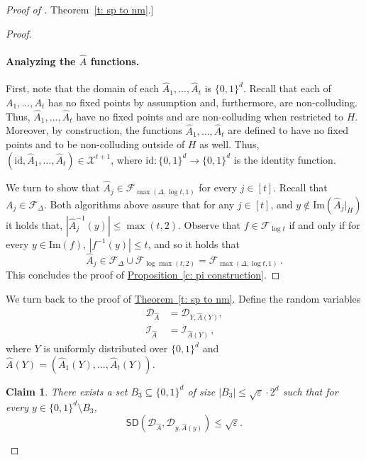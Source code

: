 \documentclass[11pt]{article}
\numberwithin{equation}{section}
\newtheorem{claim}[theorem]{Claim}
\theoremstyle{definition}
\theoremstyle{plain}
\newcommand{\expref}[2]{\hyperref[#2]{#1~\ref{#2}}}
\newcommand{\adv}{A}
\newcommand{\eps}{\varepsilon}
\newcommand{\nc}{\mathcal{X}}
\newcommand{\abs}[1]{\left\lvert #1\right\rvert}
\newcommand{\advfampart}{\mathcal{F}}
\def\SD{\ensuremath{\mathsf{SD}}}
\begin{document}
\begin{proof}[Proof of \expref{Theorem}{t: sp to nm}.]
\begin{proof}
%
\paragraph{Analyzing the $\widehat{A}$ functions.}
First, note that the domain of each $\widehat{A}_1,\ldots,\widehat{A}_t$ is $\{0,1\}^d$. Recall that each of $A_1,\ldots,A_t$ has no fixed points by assumption and, furthermore, are non-colluding. Thus, $\widehat{A}_1,\ldots,\widehat{A}_t$ have no fixed points and are non-colluding when restricted to $H$. Moreover, by construction, the functions $\widehat{A}_1,\ldots,\widehat{A}_t$ are defined to have no fixed points and to be non-colluding outside of $H$ as well. Thus,  $(\mathrm{id},\widehat{A}_1,\ldots,\widehat{A}_t) \in \nc^{t+1}$, where $\mathrm{id} \colon \{0,1\}^d \to \{0,1\}^d$ is the identity function. 

We turn to show that $\widehat{A}_j \in \advfampart_{\max(\Delta, \log t,1)}$ for every $j \in [t]$.  
Recall that $\adv_j \in \advfampart_{\Delta}$. Both algorithms above assure that for any $j\in [t]$, and $y \notin \mathrm{Im}(\widehat{A}_j|_H)$ it holds that, $\abs{\widehat{A}_j^{-1}(y)} \leq \max(t,2).$
Observe that $f \in \advfampart_{\log t}$ if and only if 
for every $y \in \mathrm{Im}(f)$, $|f^{-1}(y)| \le t$,
and so
it holds that
\[
\widehat{A}_j \in \advfampart_{\Delta} \cup \advfampart_{\log \max(t,2)} =\advfampart_{\max(\Delta, \log t,1)}\,.
\]
This concludes the proof of \expref{Proposition}{c: pi construction}.
\end{proof}

We turn back to the proof of \expref{Theorem}{t: sp to nm}.
%
Define the random variables
\begin{align*}
    \mathcal{D}_{\widehat{A}} &= \mathcal{D}_{Y,\widehat{A}(Y)},\\
    \mathcal{I}_{\widehat{A}} &= \mathcal{I}_{\widehat{A}(Y)}\,,
\end{align*}
where $Y$ is uniformly distributed over $\{0,1\}^d$ and $\widehat{A}(Y) =  (\widehat{A}_1(Y),\ldots,\widehat{A}_t(Y))$.

%

\begin{claim}\label{claim:d is concentrated}
	There exists a set $B_3 \subseteq \{0,1\}^d$ of size $\abs{B_3} \le \sqrt{\eps} \cdot 2^d$ such that for every $y \in \{0,1\}^d \setminus B_3$,
	\[
	\SD\left(\mathcal{D}_{\widehat{A}}, \mathcal{D}_{y,\widehat{A}(y)}\right) \le \sqrt{\eps}.
	\]
\end{claim}


\end{proof}
\end{document}
